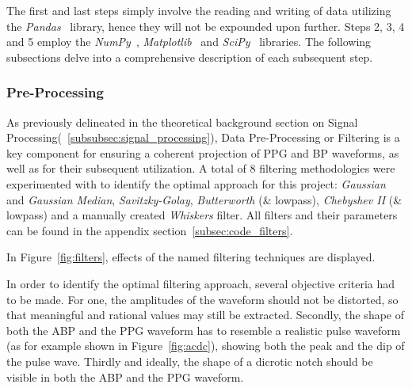 The first and last steps simply involve the reading and writing of data utilizing the \textit{Pandas}~\cite{PandasPythonData} library, hence they will not be expounded upon further.
Steps 2, 3, 4 and 5 employ the \textit{NumPy}~\cite{NumPy}, \textit{Matplotlib}~\cite{MatplotlibVisualizationPython} and \textit{SciPy}~\cite{SciPy} libraries.
The following subsections delve into a comprehensive description of each subsequent step.

\subsubsection{Pre-Processing}
\label{subsubsec:filtering}

As previously delineated in the theoretical background section on Signal Processing(~\ref{subsubsec:signal_processing}), Data Pre-Processing or Filtering is a key component for ensuring a coherent projection of PPG and BP waveforms, as well as for their subsequent utilization.
A total of 8 filtering methodologies were experimented with to identify the optimal approach for this project:
\textit{Gaussian} and \textit{Gaussian Median}, \textit{Savitzky-Golay}, \textit{Butterworth} (\& lowpass),
\textit{Chebyshev II} (\& lowpass) and a manually created \textit{Whiskers} filter.
All filters and their parameters can be found in the appendix section~\ref{subsec:code_filters}.

In Figure~\ref{fig:filters}, effects of the named filtering techniques are displayed.

In order to identify the optimal filtering approach, several objective criteria had to be made.
For one, the amplitudes of the waveform should not be distorted, so that meaningful and rational values may still be extracted.
Secondly, the shape of both the ABP and the PPG waveform has to resemble a realistic pulse waveform (as for example shown in Figure~\ref{fig:acdc}), showing both the peak and the dip of the pulse wave.
Thirdly and ideally, the shape of a dicrotic notch should be visible in both the ABP and the PPG waveform.

